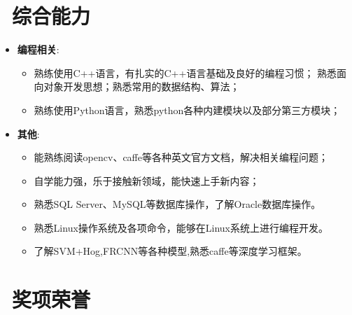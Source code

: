 \documentclass{resume}
\begin{document}


\section{\faCogs\ \textbf{综合能力}}
\begin{itemize}[parsep=0.5ex]
  \item \textbf{编程相关}:
      \begin{itemize}
        \item 熟练使用C++语言，有扎实的C++语言基础及良好的编程习惯； 熟悉面向对象开发思想；熟悉常用的数据结构、算法；
        \item 熟练使用Python语言，熟悉python各种内建模块以及部分第三方模块；
      \end{itemize}
  \item \textbf{其他}:
      \begin{itemize}
        \item 能熟练阅读opencv、caffe等各种英文官方文档，解决相关编程问题；
        \item 自学能力强，乐于接触新领域，能快速上手新内容；
        \item 熟悉SQL Server、MySQL等数据库操作，了解Oracle数据库操作。
	   \item 熟悉Linux操作系统及各项命令，能够在Linux系统上进行编程开发。
        \item 了解SVM+Hog,FRCNN等各种模型,熟悉caffe等深度学习框架。
      \end{itemize}
\end{itemize}

\section{\faHeartO\ 奖项荣誉}
\end{document}

